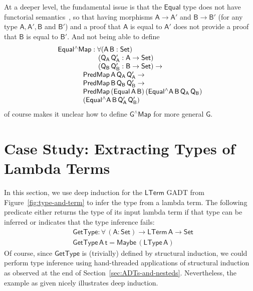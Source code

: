 \documentclass[sigplan,10pt]{acmart}
\begin{document}
At a deeper level, the fundamental issue is that the $\mathsf{Equal}$
type does not have functorial semantics~\cite{jg21}, so that having
morphisms $\mathsf{A \to A'}$ and $\mathsf{B \to B'}$ (for any type
$\mathsf{A, A', B}$ and $\mathsf{B'}$) and a proof that $\mathsf{A}$
is equal to $\mathsf{A'}$ does not provide a proof that $\mathsf{B}$
is equal to $\mathsf{B'}$. And not being able to define
\[\begin{array}{l}
\mathsf{Equal^\wedge Map : \forall (A\, B : Set)}\\
\hspace*{0.8in}\mathsf{(Q_A\, Q_A' : A \to Set)}\\
\hspace*{0.8in}\mathsf{(Q_B\, Q_B' : B \to Set) \to}\\
\hspace*{0.5in}\mathsf{PredMap\,A\,Q_A\,Q_A' \to}\\
\hspace*{0.5in}\mathsf{PredMap\,B\,Q_B\,Q_B' \to}\\
\hspace*{0.5in}\mathsf{PredMap\,(Equal\,A\,B)\,(Equal^\wedge
  A\,B\,Q_A\,Q_B)}\\
\hspace*{0.5in}\mathsf{(Equal^\wedge A\,B\,Q_A'\,Q_B')}
\end{array}\]
of course makes it unclear how to define $\mathsf{G^\wedge Map}$ for
more general $\mathsf{G}$.

\section{Case Study: Extracting Types of Lambda Terms}\label{sec:app}

In this section, we use deep induction for the $\mathsf{LTerm}$ GADT
from Figure~\ref{fig:type-and-term} to infer the type from a lambda
term. The following predicate either returns the type of its input
lambda term if that type can be inferred or indicates that the type
inference fails:
\begin{align*}
  &\mathsf{GetType : \forall \, (A : Set) \to LTerm\,A \to Set} \\
  &\mathsf{GetType \,A \,t = Maybe \, (LType \, A)}
\end{align*}
Of course, since $\mathsf{GetType}$ is (trivially) defined by
structural induction, we could perform type inference using
hand-threaded applications of structural induction as observed at the
end of Section~\ref{sec:ADTs-and-nesteds}. Nevertheless, the example
as given nicely illustrates deep induction.
\end{document}
